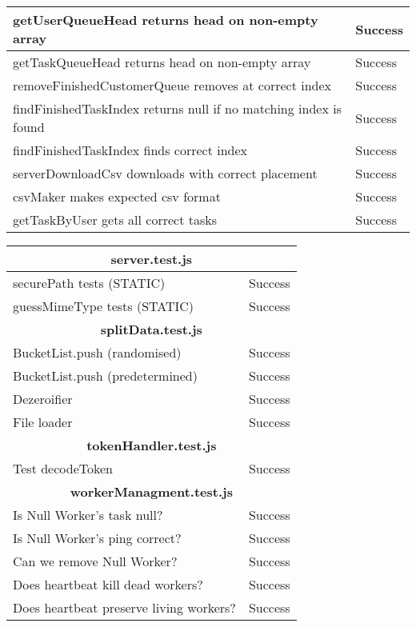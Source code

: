 \begin{table}[H]
\begin{tabular}{|p{13cm}|l|}
        getUserQueueHead returns head on non-empty array & Success\\ \hline
        getTaskQueueHead returns head on non-empty array & Success\\ \hline
        removeFinishedCustomerQueue removes at correct index & Success\\ \hline
        findFinishedTaskIndex returns null if no matching index is found & Success\\ \hline
        findFinishedTaskIndex finds correct index & Success\\ \hline
        serverDownloadCsv downloads with correct placement & Success\\ \hline
        csvMaker makes expected csv format & Success\\ \hline
        getTaskByUser gets all correct tasks & Success\\ \hline
        \end{tabular}
\end{table}
\begin{table}[H]
    \centering
    \begin{tabular}{|p{13cm}|l|}
    \hline
            \multicolumn{2}{|c|}{\textbf{server.test.js}}\\ \hline
        securePath tests (STATIC) & Success\\ \hline
        guessMimeType tests (STATIC) & Success\\ \hline
        \multicolumn{2}{|c|}{\textbf{splitData.test.js}}\\ \hline
        BucketList.push (randomised) & Success\\ \hline
        BucketList.push (predetermined) & Success\\ \hline
        Dezeroifier & Success\\ \hline
        File loader & Success\\ \hline
        \multicolumn{2}{|c|}{\textbf{tokenHandler.test.js}}\\ \hline
        Test decodeToken & Success\\ \hline
        \multicolumn{2}{|c|}{\textbf{workerManagment.test.js}}\\ \hline
        Is Null Worker's task null? & Success\\ \hline
        Is Null Worker's ping correct? & Success\\ \hline
        Can we remove Null Worker? & Success\\ \hline
        Does heartbeat kill dead workers? & Success\\ \hline
        Does heartbeat preserve living workers? & Success\\ \hline
    \end{tabular}
\end{table}